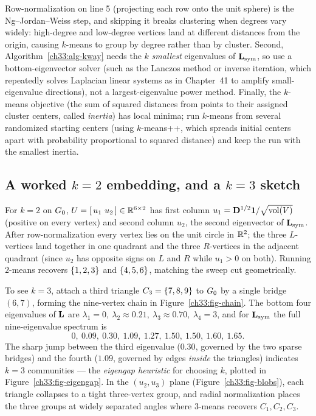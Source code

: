 \begin{trapbox}
Row-normalization on line 5 (projecting each row onto the unit sphere) is the Ng--Jordan--Weiss step, and skipping it breaks clustering when degrees vary widely: high-degree and low-degree vertices land at different distances from the origin, causing $k$-means to group by degree rather than by cluster. Second, Algorithm~\ref{ch33:alg-kway} needs the $k$ \emph{smallest} eigenvalues of $\mathbf{L}_{\mathrm{sym}}$, so use a bottom-eigenvector solver (such as the Lanczos method or inverse iteration, which repeatedly solves Laplacian linear systems as in Chapter~41 to amplify small-eigenvalue directions), not a largest-eigenvalue power method. Finally, the $k$-means objective (the sum of squared distances from points to their assigned cluster centers, called \emph{inertia}) has local minima; run $k$-means from several randomized starting centers (using $k$-means++, which spreads initial centers apart with probability proportional to squared distance) and keep the run with the smallest inertia.
\end{trapbox}

\subsection*{A worked $k=2$ embedding, and a $k=3$ sketch}

For $k=2$ on $G_0$, $U=[\,u_1\ u_2\,] \in \mathbb{R}^{6\times 2}$ has first column $u_1 = \mathbf{D}^{1/2}\mathbf{1}/\sqrt{\operatorname{vol}(V)}$ (positive on every vertex) and second column $u_2$, the second eigenvector of $\mathbf{L}_{\mathrm{sym}}$. After
row-normalization every vertex lies on the unit circle in $\mathbb{R}^2$; the three $L$-vertices land together in one quadrant and
the three $R$-vertices in the adjacent quadrant (since $u_2$ has opposite signs on $L$ and $R$ while $u_1 > 0$ on both). Running $2$-means recovers $\{1,2,3\}$ and $\{4,5,6\}$, matching the sweep cut geometrically.

To see $k=3$, attach a third triangle $C_3=\{7,8,9\}$ to $G_0$ by a single bridge $(6,7)$, forming the nine-vertex chain in Figure~\ref{ch33:fig-chain}. The bottom four eigenvalues of $\mathbf{L}$ are $\lambda_1=0,\ \lambda_2\approx 0.21,\ \lambda_3\approx 0.70,\ \lambda_4=3$, and for $\mathbf{L}_{\mathrm{sym}}$ the full nine-eigenvalue spectrum is
\[
  0,\ 0.09,\ 0.30,\ \mathbf{1.09},\ 1.27,\ 1.50,\ 1.50,\ 1.60,\ 1.65.
\]
The sharp jump between the third eigenvalue ($0.30$, governed by the two sparse bridges) and the fourth ($1.09$, governed by edges \emph{inside} the triangles) indicates $k=3$ communities --- the \emph{eigengap heuristic} for choosing $k$, plotted in Figure~\ref{ch33:fig-eigengap}. In the $(u_2,u_3)$ plane (Figure~\ref{ch33:fig-blobs}), each triangle collapses to a tight three-vertex group, and radial normalization places the three groups at widely separated angles where $3$-means recovers $C_1, C_2, C_3$.

